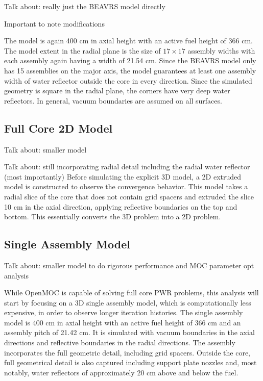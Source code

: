 Talk about: really just the BEAVRS model directly

Important to note modifications

The model is again 400 cm in axial height with an active fuel height of 366 cm. The model extent in the radial plane is the size of $17\times 17$ assembly widths with each assembly again having a width of 21.54 cm. Since the \ac{BEAVRS} model only has 15 assemblies on the major axis, the model guarantees at least one assembly width of water reflector outside the core in every direction. Since the simulated geometry is square in the radial plane, the corners have very deep water reflectors. In general, vacuum boundaries are assumed on all surfaces. 

\subsection{Full Core 2D Model}
\label{sec:beavrs-2D}

Talk about: smaller model

Talk about: still incorporating radial detail including the radial water reflector (most importantly)
Before simulating the explicit 3D model, a 2D extruded model is constructed to observe the convergence behavior. This model takes a radial slice of the core that does not contain grid spacers and extruded the slice 10 cm in the axial direction, applying reflective boundaries on the top and bottom. This essentially converts the 3D problem into a 2D problem.

\subsection{Single Assembly Model}
\label{sec:beavrs-single-assembly}

Talk about: smaller model to do rigorous performance and MOC parameter opt analysis

While OpenMOC is capable of solving full core \ac{PWR} problems, this analysis will start by focusing on a 3D single assembly model, which is computationally less expensive, in order to observe longer iteration histories. The single assembly model is 400 cm in axial height with an active fuel height of 366 cm and an assembly pitch of 21.42 cm. It is simulated with vacuum boundaries in the axial directions and reflective boundaries in the radial directions. The assembly incorporates the full geometric detail, including grid spacers. Outside the core, full geometrical detail is also captured including support plate nozzles and, most notably, water reflectors of approximately 20 cm above and below the fuel.

